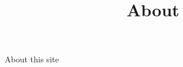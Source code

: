 \documentclass[
  12pt,
]{scrbook}
\title{About}
\author{}
\date{}
\begin{document}
\frontmatter
\maketitle


\mainmatter
About this site


\backmatter
\end{document}
